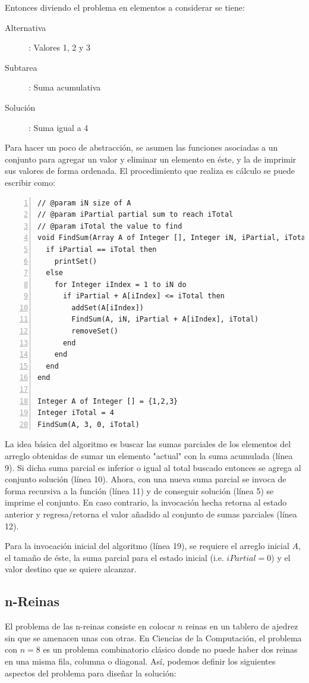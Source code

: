 Entonces diviendo el problema en elementos a considerar se tiene:
\begin{description}
\item [Alternativa]: Valores 1, 2 y 3
\item [Subtarea]: Suma acumulativa
\item [Solución]: Suma igual a 4
\end{description}

Para hacer un poco de abstracción, se asumen las funciones asociadas a un conjunto para agregar un valor y eliminar un elemento en éste, y la de imprimir sus valores de forma ordenada. El procedimiento que realiza es cálculo se puede escribir como:

\begin{lstlisting}[upquote=true, language=pseudo, numbers=left]
// @param iN size of A
// @param iPartial partial sum to reach iTotal
// @param iTotal the value to find
void FindSum(Array A of Integer [], Integer iN, iPartial, iTotal)
  if iPartial == iTotal then
    printSet()
  else
    for Integer iIndex = 1 to iN do
      if iPartial + A[iIndex] <= iTotal then
        addSet(A[iIndex])
        FindSum(A, iN, iPartial + A[iIndex], iTotal)
        removeSet()
      end
    end
  end
end

Integer A of Integer [] = {1,2,3}
Integer iTotal = 4
FindSum(A, 3, 0, iTotal)
\end{lstlisting}

La idea básica del algoritmo es buscar las sumas parciales de los elementos del arreglo obtenidas de sumar un elemento "actual" con la suma acumulada (línea 9). Si dicha suma parcial es inferior o igual al total buscado entonces se agrega al conjunto solución (línea 10). Ahora, con una nueva suma parcial se invoca de forma recursiva a la función (línea 11) y de conseguir solución (línea 5) se imprime el conjunto. En caso contrario, la invocación hecha retorna al estado anterior y regresa/retorna el valor añadido al conjunto de sumas parciales (línea 12).

Para la invocación inicial del algoritmo (línea 19), se requiere el arreglo inicial $A$, el tamaño de éste, la suma parcial para el estado inicial (i.e. $iPartial = 0$) y el valor destino que se quiere alcanzar.

\subsection{n-Reinas}

El problema de las n-reinas consiste en colocar $n$ reinas en un tablero de ajedrez sin que se amenacen unas con otras. En Ciencias de la Computación, el problema con $n=8$ es un problema combinatorio clásico donde no puede haber dos reinas en una misma fila, columna o diagonal. Así, podemos definir los siguientes aspectos del problema para diseñar la solución:

